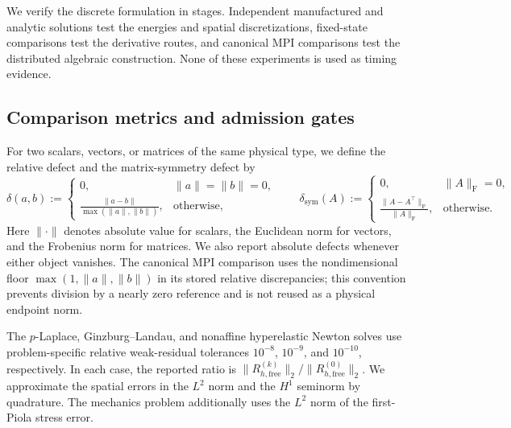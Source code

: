 \label{sec:validation}

We verify the discrete formulation in stages. Independent manufactured and
analytic solutions test the energies and spatial discretizations, fixed-state
comparisons test the derivative routes, and canonical MPI comparisons test the
distributed algebraic construction. None of these experiments is used as
timing evidence.

\subsection{Comparison metrics and admission gates}
\label{subsec:verification-normalization}

For two scalars, vectors, or matrices of the same physical type, we define the
relative defect and the matrix-symmetry defect by
\begin{equation}
  \delta(a,b):=
  \begin{cases}
    0, & \lVert a\rVert=\lVert b\rVert=0,\\
    \displaystyle\frac{\lVert a-b\rVert}
      {\max(\lVert a\rVert,\lVert b\rVert)}, & \text{otherwise},
  \end{cases}
  \qquad
  \delta_{\mathrm{sym}}(A):=
  \begin{cases}
    0, & \lVert A\rVert_{\mathrm F}=0,\\
    \displaystyle\frac{\lVert A-A^\top\rVert_{\mathrm F}}
      {\lVert A\rVert_{\mathrm F}}, & \text{otherwise}.
  \end{cases}
  \label{eq:verification-relative-defects}
\end{equation}
Here $\lVert\cdot\rVert$ denotes absolute value for scalars, the Euclidean norm
for vectors, and the Frobenius norm for matrices. We also report absolute
defects whenever either object vanishes. The canonical MPI comparison uses the
nondimensional floor $\max(1,\lVert a\rVert,\lVert b\rVert)$ in its stored
relative discrepancies; this convention prevents division by a nearly zero
reference and is not reused as a physical endpoint norm.

The $p$-Laplace, Ginzburg--Landau, and nonaffine hyperelastic Newton solves use
problem-specific relative weak-residual tolerances $10^{-8}$, $10^{-9}$, and
$10^{-10}$, respectively. In each case, the reported ratio is
$\lVert R_{h,\mathrm{free}}^{(k)}\rVert_2/
 \lVert R_{h,\mathrm{free}}^{(0)}\rVert_2$.
We approximate the spatial errors in the $L^2$ norm and the $H^1$ seminorm by
quadrature. The mechanics problem additionally uses the $L^2$ norm of the
first-Piola stress error.

